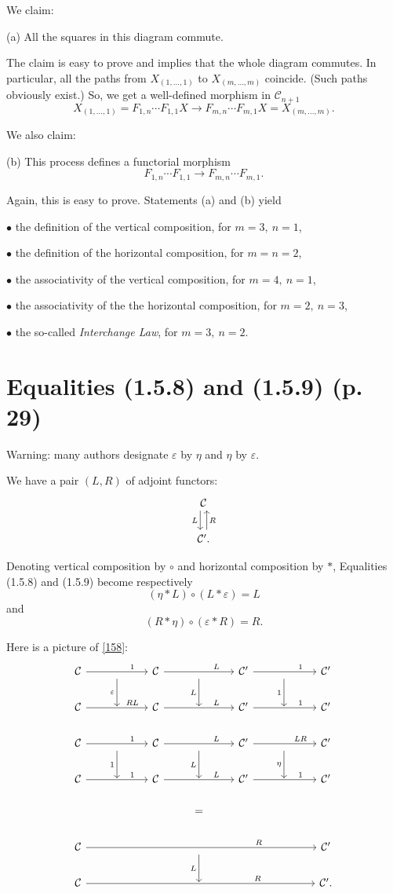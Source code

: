 \documentclass[12pt]{article}
\theoremstyle{remark}%
\newcommand{\bu}{\bullet}
\newcommand{\n}{\noindent}
\newcommand{\C}{\mathcal C}
\newcommand{\e}{\varepsilon}
\newcommand{\be}{\begin{equation}}
\newcommand{\ee}{\end{equation}}
\begin{document}
We claim: 

\n(a) All the squares in this diagram commute. 

The claim is easy to prove and implies that the whole diagram commutes. In particular, all the paths from $X_{(1,\dots,1)}$ to $X_{(m,\dots,m)}$ coincide. (Such paths obviously exist.) So, we get a well-defined morphism in $\C_{n+1}$
$$
X_{(1,\dots,1)}=F_{1,n}\cdots F_{1,1}X\to F_{m,n}\cdots F_{m,1}X=X_{(m,\dots,m)}.
$$

We also claim: 

\n(b) This process defines a functorial morphism 
$$
F_{1,n}\cdots F_{1,1}\to F_{m,n}\cdots F_{m,1}.
$$

Again, this is easy to prove. Statements (a) and (b) yield 

\n$\bu$ the definition of the vertical composition, for $m=3,\ n=1$,

\n$\bu$ the definition of the horizontal composition, for $m=n=2$,

\n$\bu$ the associativity of the vertical composition, for $m=4,\ n=1$,

\n$\bu$ the associativity of the the horizontal composition, for $m=2,\ n=3$,

\n$\bu$ the so-called \emph{Interchange Law}, for $m=3,\ n=2$.
%
\section{Equalities (1.5.8) and (1.5.9) (p. 29)}%
%
Warning: many authors designate $\e$ by $\eta$ and $\eta$ by $\e$. 

We have a pair $(L,R)$ of adjoint functors: 
$$
\begin{tikzcd}
\C\ar[xshift=-.7ex]{d}[swap]{L}\\ 
\C'.\ar[xshift=.7ex]{u}[swap]{R}
\end{tikzcd}
$$

Denoting vertical composition by $\circ$ and horizontal composition by $*$, Equalities (1.5.8) and (1.5.9) become respectively 
%
\be\label{158} 
(\eta*L)\circ(L*\e)=L
\ee 
% 
and 
%
\be\label{159} 
(R*\eta)\circ(\e*R)=R.
\ee 
% 

Here is a picture of \eqref{158}: 
$$
\begin{tikzcd}
%
\C\ar{rr}{}[near end]{1}&\ar{d}[swap]{\e}&\C\ar{rr}{}[near end]{L}&\ar{d}[swap]{L}&\C'\ar{rr}{}[near end]{1}&\ar{d}[swap]{1}&\C'\\ 
%
\C\ar{rr}{}[near end]{RL}&{}&\C\ar{rr}{}[near end]{L}&{}&\C'\ar{rr}{}[near end]{1}&{}&\C'\\ 
%
\C\ar{rr}{}[near end]{1}&\ar{d}[swap]{1}&\C\ar{rr}{}[near end]{L}&\ar{d}[swap]{L}&\C'\ar{rr}{}[near end]{LR}&\ar{d}[swap]{\eta}&\C'\\ 
%
\C\ar{rr}{}[near end]{1}&{}&\C\ar{rr}{}[near end]{L}&{}&\C'\ar{rr}{}[near end]{1}&{}&\C'\\ 
%
&&&=\\ 
%
\C\ar{rrrrrr}[near end]{R}&&&{}\ar{d}[swap]{L}&&&\C'\\
%
\C\ar{rrrrrr}[near end]{R}&&&{}&&&\C'.
%
\end{tikzcd}
$$ 
\end{document}
